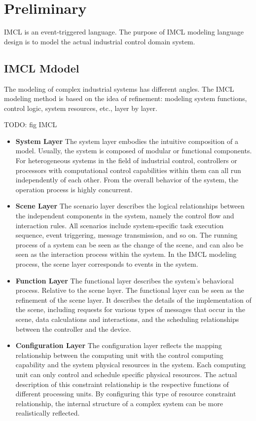 \section{Preliminary}
IMCL is an event-triggered language.
The purpose of IMCL modeling language design is to model the actual industrial control domain system.


\subsection{IMCL Mdodel}
The modeling of complex industrial systems has different angles.
The IMCL modeling method is based on the idea of refinement: modeling system functions, control logic, system resources, etc., layer by layer.


TODO: fig IMCL

\begin{itemize}
  \item \textbf{System Layer} The system layer embodies the intuitive composition of a model. Usually, the system is composed of modular or functional components. For heterogeneous systems in the field of industrial control, controllers or processors with computational control capabilities within them can all run independently of each other. From the overall behavior of the system, the operation process is highly concurrent.
  \item \textbf{Scene Layer} The scenario layer describes the logical relationships between the independent components in the system, namely the control flow and interaction rules. All scenarios include system-specific task execution sequence, event triggering, message transmission, and so on. The running process of a system can be seen as the change of the scene, and can also be seen as the interaction process within the system. In the IMCL modeling process, the scene layer corresponds to events in the system.
  \item \textbf{Function Layer} The functional layer describes the system's behavioral process. Relative to the scene layer. The functional layer can be seen as the refinement of the scene layer. It describes the details of the implementation of the scene, including requests for various types of messages that occur in the scene, data calculations and interactions, and the scheduling relationships between the controller and the device.
  \item \textbf{Configuration Layer} The configuration layer reflects the mapping relationship between the computing unit with the control computing capability and the system physical resources in the system. Each computing unit can only control and schedule specific physical resources. The actual description of this constraint relationship is the respective functions of different processing units. By configuring this type of resource constraint relationship, the internal structure of a complex system can be more realistically reflected.
\end{itemize}

